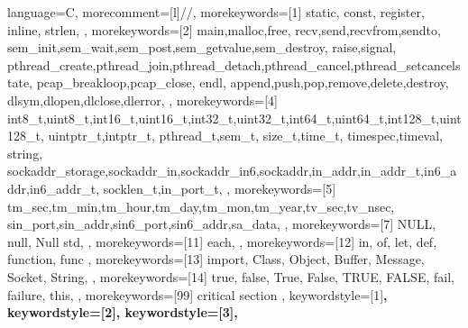 %
%
%
%
%
%
%
%
{%
    language=C,%
    morecomment=[l]{//},%
    morekeywords=[1]{%
        static,
        const,
        register,
        inline,
        strlen,
    },%
    morekeywords=[2]{%
        main,malloc,free,
        recv,send,recvfrom,sendto,
        sem_init,sem_wait,sem_post,sem_getvalue,sem_destroy,
        raise,signal,
        pthread_create,pthread_join,pthread_detach,pthread_cancel,pthread_setcancelstate,
        pcap_breakloop,pcap_close,
        endl,
        append,push,pop,remove,delete,destroy,
        dlsym,dlopen,dlclose,dlerror,
    },%
    morekeywords=[4]{%
        int8_t,uint8_t,int16_t,uint16_t,int32_t,uint32_t,int64_t,uint64_t,int128_t,uint128_t,
        uintptr_t,intptr_t,
        pthread_t,sem_t,
        size_t,time_t,
        timespec,timeval,
        string,
        sockaddr_storage,sockaddr_in,sockaddr_in6,sockaddr,in_addr,in_addr_t,in6_addr,in6_addr_t,
        socklen_t,in_port_t,
    },%
    morekeywords=[5]{%
        tm_sec,tm_min,tm_hour,tm_day,tm_mon,tm_year,tv_sec,tv_nsec,
        sin_port,sin_addr,sin6_port,sin6_addr,sa_data,
    },%
    morekeywords=[7]{%
        NULL, null, Null
        std,
    },%
    morekeywords=[11]{%
        each,
    },%
    morekeywords=[12]{%
        in, of, let, def,
        function, func
    },%
    morekeywords=[13]{%
        import,
        Class, Object,
        Buffer, Message,
        Socket, String,
    },%
    morekeywords=[14]{%
        true, false, True, False, TRUE, FALSE,
        fail, failure,
        this,
    },%
    morekeywords=[99]{%
        critical section
    },%
    keywordstyle=[1]\color{lstCol_C_purple}\bfseries,%
    keywordstyle=[2]\color{lstCol_C_violet}\bfseries,%
    keywordstyle=[3]\color{lstCol_C_func},%
}
